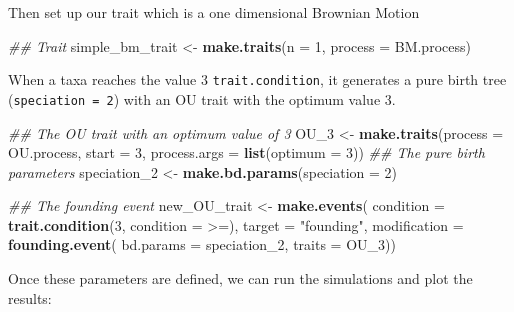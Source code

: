 \documentclass[
]{book}
\newenvironment{Shaded}{\begin{snugshade}}{\end{snugshade}}
\newcommand{\CommentTok}[1]{\textcolor[rgb]{0.56,0.35,0.01}{\textit{#1}}}
\newcommand{\DataTypeTok}[1]{\textcolor[rgb]{0.13,0.29,0.53}{#1}}
\newcommand{\DecValTok}[1]{\textcolor[rgb]{0.00,0.00,0.81}{#1}}
\newcommand{\KeywordTok}[1]{\textcolor[rgb]{0.13,0.29,0.53}{\textbf{#1}}}
\newcommand{\NormalTok}[1]{#1}
\newcommand{\StringTok}[1]{\textcolor[rgb]{0.31,0.60,0.02}{#1}}
\begin{document}
Then set up our trait which is a one dimensional Brownian Motion

\begin{Shaded}
\begin{Highlighting}[]
\CommentTok{\#\# Trait}
\NormalTok{simple\_bm\_trait \textless{}{-}}\StringTok{ }\KeywordTok{make.traits}\NormalTok{(}\DataTypeTok{n =} \DecValTok{1}\NormalTok{, }\DataTypeTok{process =}\NormalTok{ BM.process)}
\end{Highlighting}
\end{Shaded}

When a taxa reaches the value 3 \texttt{trait.condition}, it generates a pure birth tree (\texttt{speciation\ =\ 2}) with an OU trait with the optimum value 3.

\begin{Shaded}
\begin{Highlighting}[]
\CommentTok{\#\# The OU trait with an optimum value of 3}
\NormalTok{OU\_}\DecValTok{3}\NormalTok{ \textless{}{-}}\StringTok{ }\KeywordTok{make.traits}\NormalTok{(}\DataTypeTok{process =}\NormalTok{ OU.process,}
                    \DataTypeTok{start =} \DecValTok{3}\NormalTok{, }\DataTypeTok{process.args =} \KeywordTok{list}\NormalTok{(}\DataTypeTok{optimum =} \DecValTok{3}\NormalTok{))}
\CommentTok{\#\# The pure birth parameters}
\NormalTok{speciation\_}\DecValTok{2}\NormalTok{ \textless{}{-}}\StringTok{ }\KeywordTok{make.bd.params}\NormalTok{(}\DataTypeTok{speciation =} \DecValTok{2}\NormalTok{)}

\CommentTok{\#\# The founding event}
\NormalTok{new\_OU\_trait \textless{}{-}}\StringTok{ }\KeywordTok{make.events}\NormalTok{(}
                    \DataTypeTok{condition    =} \KeywordTok{trait.condition}\NormalTok{(}\DecValTok{3}\NormalTok{, }\DataTypeTok{condition =} \StringTok{\textasciigrave{}}\DataTypeTok{\textgreater{}=}\StringTok{\textasciigrave{}}\NormalTok{),}
                    \DataTypeTok{target       =} \StringTok{"founding"}\NormalTok{,}
                    \DataTypeTok{modification =} \KeywordTok{founding.event}\NormalTok{(}
                                    \DataTypeTok{bd.params =}\NormalTok{ speciation\_}\DecValTok{2}\NormalTok{,}
                                    \DataTypeTok{traits    =}\NormalTok{ OU\_}\DecValTok{3}\NormalTok{))}
\end{Highlighting}
\end{Shaded}

Once these parameters are defined, we can run the simulations and plot the results:
\end{document}
